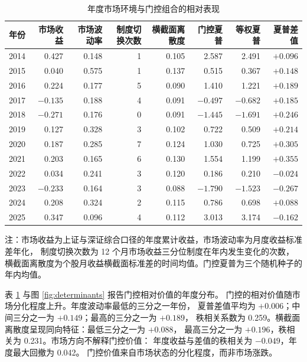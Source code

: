 \begin{table}[htbp]
\centering
\caption{年度市场环境与门控组合的相对表现}
\label{tab:year-env}
\begin{threeparttable}
\footnotesize
\begin{tabular}{lrrrrrrr}
\toprule
年份 & 市场收益 & 市场波动率 & 制度切换次数 & 横截面离散度
& 门控夏普 & 等权夏普 & 夏普差值 \\
\midrule
2014 & 0.427 & 0.148 & 1 & 0.105 & 2.587 & 2.491 & $+0.096$ \\
2015 & 0.040 & 0.575 & 1 & 0.137 & 0.515 & 0.367 & $+0.148$ \\
2016 & 0.224 & 0.177 & 5 & 0.090 & 1.410 & 1.221 & $+0.189$ \\
2017 & $-0.135$ & 0.188 & 4 & 0.091 & $-0.497$ & $-0.682$ & $+0.185$ \\
2018 & $-0.271$ & 0.176 & 0 & 0.091 & $-1.445$ & $-1.691$ & $+0.246$ \\
2019 & 0.127 & 0.328 & 3 & 0.102 & 0.722 & 0.509 & $+0.214$ \\
2020 & 0.187 & 0.285 & 7 & 0.124 & 1.030 & 0.725 & $+0.305$ \\
2021 & 0.203 & 0.165 & 6 & 0.130 & 1.554 & 1.199 & $+0.355$ \\
2022 & 0.034 & 0.241 & 3 & 0.120 & 0.186 & 0.210 & $-0.024$ \\
2023 & $-0.233$ & 0.164 & 3 & 0.088 & $-1.790$ & $-1.523$ & $-0.267$ \\
2024 & 0.208 & 0.324 & 2 & 0.115 & 0.786 & 0.698 & $+0.088$ \\
2025 & 0.347 & 0.096 & 4 & 0.112 & 3.013 & 3.174 & $-0.162$ \\
\bottomrule
\end{tabular}
\begin{tablenotes}[flushleft]\footnotesize
\item 注：市场收益为上证与深证综合口径的年度累计收益，市场波动率为月度收益标准差年化，
制度切换次数为 12 个月市场收益三分位制度在年内发生变化的次数，
横截面离散度为个股月收益横截面标准差的时间均值。门控夏普为三个随机种子的年内均值。
\end{tablenotes}
\end{threeparttable}
\end{table}

表 \ref{tab:year-env} 与图 \ref{fig:determinants} 报告门控相对价值的年度分布。
门控的相对价值随市场分化程度上升。年度波动率最低的三分之一年份，
夏普差值平均为 $+0.006$；中间三分之一为 $+0.149$；最高的三分之一为 $+0.189$，
秩相关系数为 0.259。横截面离散度呈现同向特征：最低三分之一为 $+0.088$，
最高三分之一为 $+0.196$，秩相关为 0.231。市场方向不解释门控价值：
年度收益与差值的秩相关为 $-0.049$，年度最大回撤为 0.042。
门控价值来自市场状态的分化程度，而非市场涨跌。


